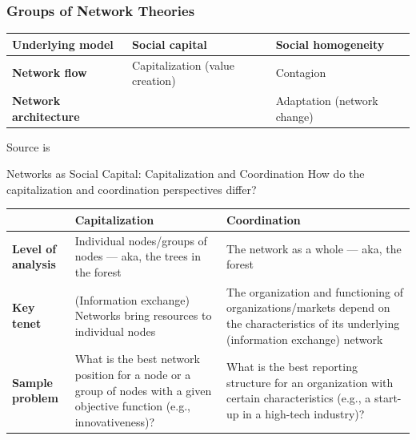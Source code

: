 \documentclass[notes, aspectratio=1610]{beamer}
\begin{document}
\begin{frame}
	\frametitle{Groups of Network Theories}
	\centering
	\small
	\begin{table}
		\begin{center}
			\begin{tabular}[c]{l|l|l}
				\textbf{Underlying model} & 
				\textbf{Social capital} &
				\textbf{Social homogeneity}\\
				\hline
				\textbf{Network flow} &
				Capitalization (value creation) & 
				Contagion  \\
				\hline
				\textbf{Network architecture} &  
				\cellcolor{blue!20}{\color{black}{Coordination}} & 
				Adaptation  (network change)\\
			\end{tabular}
		\end{center}
	\end{table}

	\vspace{1em}

	\raggedright \small Source is~\cite[][page 47]{scott2011}
\end{frame}

\begin{frame}{Networks as Social Capital: Capitalization and Coordination}
	{How do the capitalization and coordination perspectives differ?}
	\small
	\begin{table}
	\begin{center}
		\begin{tabular}[c]{p{2.75cm}|p{4.5cm}|p{4.5cm}}
			\textbf{} &
			\textbf{Capitalization} & 
			\textbf{Coordination} \\
			\hline
			\textbf{Level of analysis} &
			Individual nodes/groups of nodes --- aka, the trees 
			in the forest &
			The network as a whole --- aka, the forest \\ \hline
			\textbf{Key tenet} &
			(Information exchange) Networks bring resources to 
			individual nodes & 
			The organization and functioning of organizations/markets 
			depend on the characteristics of its underlying 
			(information exchange) network \\ \hline
			\textbf{Sample problem} &
			What is the best network position for a node or a group 
			of nodes with a given objective function (e.g.,
			innovativeness)? & What is the best reporting structure
			for an organization with certain characteristics (e.g.,
			a start-up in a high-tech industry)?\\
			\hline
		\end{tabular}
	\end{center}
	\end{table}	
\end{frame}
\end{document}
